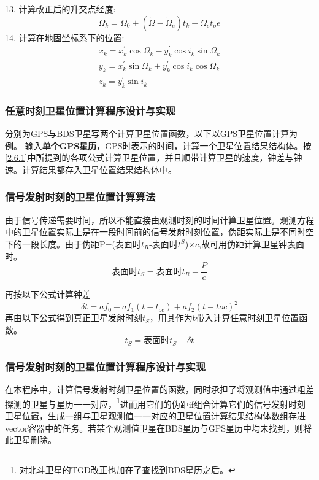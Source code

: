 \documentclass{ctexart}
\begin{document}
13. 计算改正后的升交点经度:
\begin{equation}
\Omega_{k}=\Omega_{0}+\left(\dot{\Omega}-\dot{\Omega}_{e}\right) t_{k}-\Omega_{e} t_{o} e
\end{equation}
14. 计算在地固坐标系下的位置:
\begin{equation}
\begin{gathered}
x_{k}=x_{k}^{\prime} \cos \Omega_{k}-y_{k}^{\prime} \cos i_{k} \sin \Omega_{k} \\
y_{k}=x_{k}^{\prime} \sin \Omega_{k}+y_{k}^{\prime} \cos i_{k} \cos \Omega_{k} \\
z_{k}=y_{k}^{\prime} \sin i_{k}
\end{gathered}
\end{equation}

\subsubsection{任意时刻卫星位置计算程序设计与实现}
分别为GPS与BDS卫星写两个计算卫星位置函数，以下以GPS卫星位置计算为例。
输入\textbf{单个GPS星历}，GPS时表示的时间，计算一个卫星位置结果结构体。按\ref{2.6.1}中所提到的各项公式计算卫星位置，并且顺带计算卫星的速度，钟差与钟速。计算结果都存入卫星位置结果结构体中。

\subsubsection{信号发射时刻的卫星位置计算算法}
由于信号传递需要时间，所以不能直接由观测时刻的时间计算卫星位置。观测方程中的卫星位置实际上是在一段时间前的信号发射时刻位置，伪距实际上是不同时空下的一段长度。由于伪距P=(表面时$t_R$-表面时$t^S$)$\times c$,故可用伪距计算卫星钟表面时。
\begin{equation}
\mbox{表面时} t_S=\mbox{表面时}t_R-\frac{P}{c}
\end{equation}

再按以下公式计算钟差
\begin{equation}
\delta t=af_0+af_1(t-t_{oc})+af_2(t-t{oc})^2
\end{equation}
再由以下公式得到真正卫星发射时刻$t_S$，用其作为t带入计算任意时刻卫星位置函数。
\begin{equation}
t_S=\mbox{表面时} t_S-\delta t
\end{equation}

\subsubsection{信号发射时刻的卫星位置计算程序设计与实现}
在本程序中，计算信号发射时刻卫星位置的函数，同时承担了将观测值中通过粗差探测的卫星与星历一一对应，\footnote{对北斗卫星的TGD改正也加在了查找到BDS星历之后。}进而用它们的伪距if组合计算它们的信号发射时刻卫星位置，生成一组与卫星观测值一一对应的卫星位置计算结果结构体数组存进vector容器中的任务。若某个观测值卫星在BDS星历与GPS星历中均未找到，则将此卫星删除。
\end{document}

